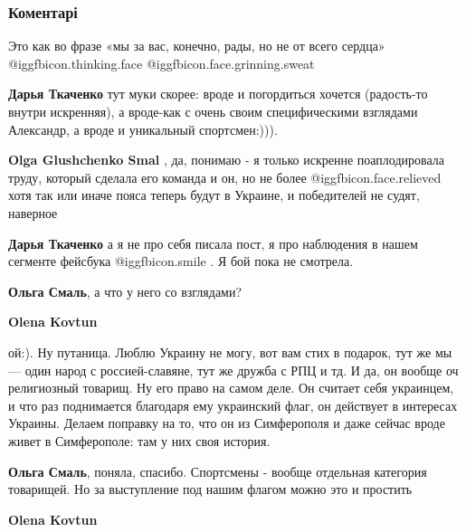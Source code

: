  
 
 
 
 
\subsubsection{Коментарі}

\begin{itemize} %
Это как во фразе «мы за вас, конечно, рады, но не от всего сердца» @igg{fbicon.thinking.face}  @igg{fbicon.face.grinning.sweat} 

\begin{itemize} %
\textbf{Дарья Ткаченко} тут муки скорее: вроде и погордиться хочется (радость-то внутри искренняя), а вроде-как с очень своим специфическими взглядами Александр, а вроде и уникальный спортсмен:))).

\textbf{Olga Glushchenko Smal} , да, понимаю - я только искренне поаплодировала труду, который сделала его команда и он, но не более @igg{fbicon.face.relieved} хотя так или иначе пояса теперь будут в Украине, и победителей не судят, наверное

\textbf{Дарья Ткаченко} а я не про себя писала пост, я про наблюдения в нашем сегменте фейсбука @igg{fbicon.smile} . Я бой пока не смотрела.

\textbf{Ольга Смаль}, а что у него со взглядами?

\textbf{Olena Kovtun} 

ой:). Ну путаница. Люблю Украину не могу, вот вам стих в подарок, тут же мы —
один народ с россией-славяне, тут же дружба с РПЦ и тд. И да, он вообще оч
религиозный товарищ. Ну его право на самом деле. Он считает себя украинцем, и
что раз поднимается благодаря ему украинский флаг, он действует в интересах
Украины. Делаем поправку на то, что он из Симферополя и даже сейчас вроде живет
в Симферополе: там у них своя история.


\textbf{Ольга Смаль}, поняла, спасибо. Спортсмены - вообще отдельная категория товарищей. Но за выступление под нашим флагом можно это и простить

\textbf{Olena Kovtun} 


\end{itemize}
\end{itemize}
